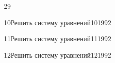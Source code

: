 \begin{TrigSourcePage}{29}
\begin{TrigExercise}{10}{Решить систему уравнений}{10}{1992}
\end{TrigExercise}
\begin{TrigExercise}{11}{Решить систему уравнений}{11}{1992}
\end{TrigExercise}
\begin{TrigExercise}{12}{Решить систему уравнений}{12}{1992}
\end{TrigExercise}
\end{TrigSourcePage}

